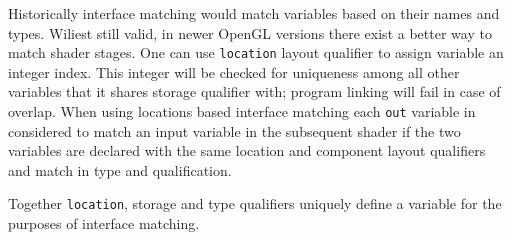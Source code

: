 Historically interface matching would match variables based on their names and types.
Wiliest still valid, in newer OpenGL versions there exist a better way to match shader stages. 
One can use \texttt{location} layout qualifier to assign variable an integer index.
This integer will be checked for uniqueness among all other variables that it shares storage qualifier with; program linking will fail in case of overlap.
When using locations based interface matching each \texttt{out} variable in considered to match an input variable in the subsequent shader if
the two variables are declared with the same location and component layout qualifiers and match in type and qualification.

Together \texttt{location}, storage and type qualifiers uniquely define a variable for the purposes of interface matching.
